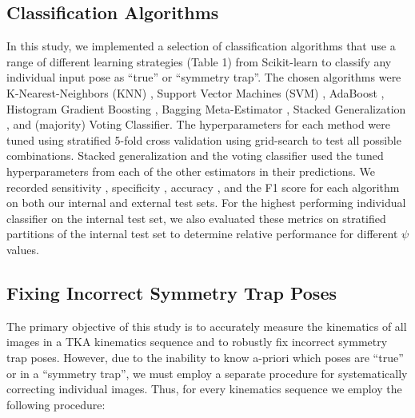 \subsection{Classification Algorithms}
In this study, we implemented a selection of classification algorithms that use a range of different learning strategies (Table 1) from Scikit-learn \cite{scikit-learn} to classify any individual input pose as  ``true'' or ``symmetry trap''.
The chosen algorithms were K-Nearest-Neighbors (KNN) \cite{fixDiscriminatoryAnalysisNanparametric1951},
Support Vector Machines (SVM) \cite{cortesSupportvectorNetworks1995}, AdaBoost \cite{friedmanGreedyFunctionApproximation2001},
Histogram Gradient Boosting \cite{freundDecisionTheoreticGeneralizationOnLine1997},
Bagging Meta-Estimator \cite{breimanBaggingPredictors1996},
Stacked Generalization \cite{smythLinearlyCombiningDensity1999,wolpertStackedGeneralization1992},
and (majority) Voting Classifier.
The hyperparameters for each method were tuned using stratified 5-fold cross validation using grid-search to test all possible combinations.
Stacked generalization and the voting classifier used the tuned hyperparameters from each of the other estimators in their predictions.
We recorded sensitivity \cite{yerushalmyStatisticalProblemsAssessing1947}, specificity \cite{yerushalmyStatisticalProblemsAssessing1947}, accuracy \cite{internationalorganizationforstandardizationAccuracyTruenessPrecision2023},
and the F1 score \cite{tahaMetricsEvaluating3D2015} for each algorithm on both our internal and external test sets.
For the highest performing individual classifier on the internal test set, we also evaluated these metrics on stratified partitions of the internal test set to determine relative performance for different $\psi$ values.


\subsection{Fixing Incorrect Symmetry Trap Poses}
The primary objective of this study is to accurately measure the kinematics of all images in a TKA kinematics sequence and to robustly fix incorrect symmetry trap poses.
However, due to the inability to know a-priori which poses are “true” or in a “symmetry trap”, we must employ a separate procedure for systematically correcting individual images.
Thus, for every kinematics sequence we employ the following procedure:

